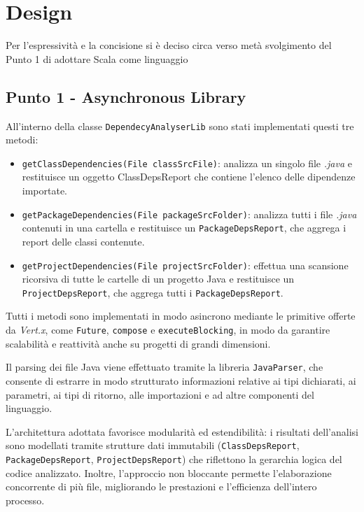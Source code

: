 \documentclass[a4paper,12pt]{report}
\begin{document}
    \chapter{Design}
    Per l'espressività e la concisione si è deciso circa verso metà svolgimento
    del Punto 1 di adottare Scala come linguaggio
    \section{Punto 1 - Asynchronous Library}
    All'interno della classe \texttt{DependecyAnalyserLib} sono stati implementati questi tre metodi:
    \begin{itemize}
        \item \texttt{getClassDependencies(File classSrcFile)}: analizza un singolo file \emph{.java} e restituisce un oggetto ClassDepsReport che contiene l'elenco delle dipendenze importate.

        \item \texttt{getPackageDependencies(File packageSrcFolder)}: analizza tutti i file \emph{.java} contenuti in una cartella e restituisce un \texttt{PackageDepsReport}, che aggrega i report delle classi contenute.

        \item \texttt{getProjectDependencies(File projectSrcFolder)}: effettua una scansione ricorsiva di tutte le cartelle di un progetto Java e restituisce un \texttt{ProjectDepsReport}, che aggrega tutti i \texttt{PackageDepsReport}.
    \end{itemize}

    Tutti i metodi sono implementati in modo asincrono mediante le primitive offerte da \emph{Vert.x}, come \texttt{Future}, \texttt{compose} e \texttt{executeBlocking}, in modo da garantire scalabilità e reattività anche su progetti di grandi dimensioni.

    Il parsing dei file Java viene effettuato tramite la libreria \texttt{JavaParser}, che consente di estrarre in modo strutturato informazioni relative ai tipi dichiarati, ai parametri, ai tipi di ritorno, alle importazioni e ad altre componenti del linguaggio.

    L’architettura adottata favorisce modularità ed estendibilità: i risultati dell’analisi sono modellati tramite strutture dati immutabili (\texttt{ClassDepsReport}, \texttt{PackageDepsReport}, \texttt{ProjectDepsReport}) che riflettono la gerarchia logica del codice analizzato. Inoltre, l’approccio non bloccante permette l’elaborazione concorrente di più file, migliorando le prestazioni e l’efficienza dell’intero processo.
\end{document}

